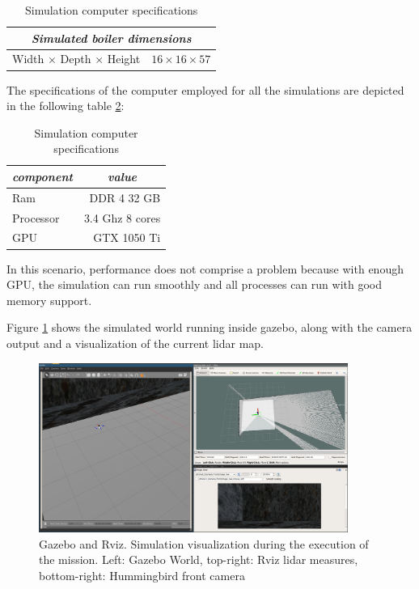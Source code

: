     \begin{table}[!h]
      \centering
      \begin{tabular}{lr} \toprule
        \multicolumn{2}{c}{\textit{Simulated boiler dimensions}}        \\ \midrule
        Width $\times$ Depth $\times$ Height & $16 \times 16 \times 57$ \\ \bottomrule
        \hline
      \end{tabular}
      \caption{Simulation computer specifications}
      \label{ch_5:table:boiler_sim_dims}
    \end{table}

    The specifications of the computer employed for all the simulations are depicted in the following table \ref{ch_5:table:laptop_specs}:

    \begin{table}[!h]
      \centering
      \begin{tabular}{lr} \toprule
        \multicolumn{1}{c}{\textit{component}} & \multicolumn{1}{c}{\textit{value}}   \\ \midrule
        Ram           & DDR 4 32 GB     \\
        Processor     & 3.4 Ghz 8 cores \\
        GPU           & GTX 1050 Ti     \\ \bottomrule
        \hline
      \end{tabular}
      \caption{Simulation computer specifications}
      \label{ch_5:table:laptop_specs}
    \end{table}

    In this scenario, performance does not comprise a problem because with enough GPU, the simulation can run smoothly and all processes can run with good memory support.

    Figure \ref{ch_5:fig:full_sim} shows the simulated world running inside gazebo, along with the camera output and a visualization of the current lidar map.
    
    \begin{figure}
      \centering
      \includegraphics[width=0.9\textwidth,height=0.5\textheight,keepaspectratio]{./Figures/FullSim.png}
      \caption{Gazebo and Rviz. Simulation visualization during the execution of the mission. Left: Gazebo World, top-right: Rviz lidar measures, bottom-right: Hummingbird front camera}
      \label{ch_5:fig:full_sim}
    \end{figure}

